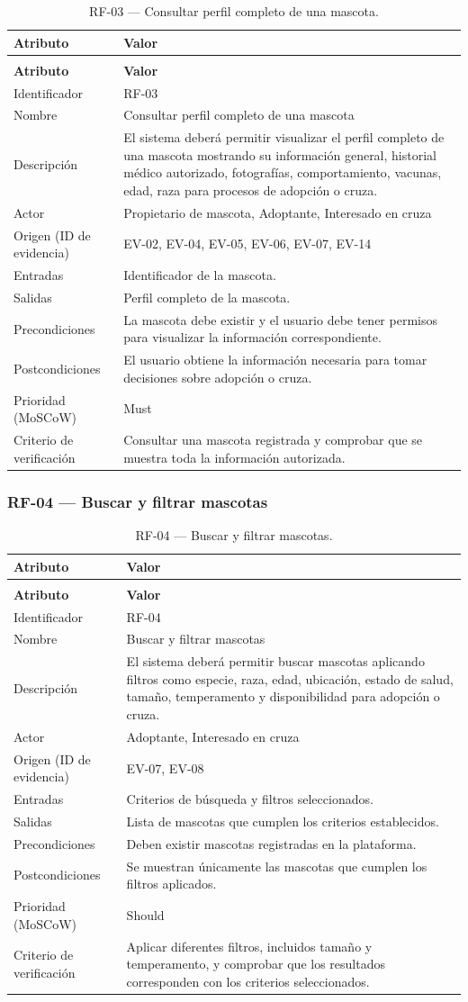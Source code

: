 \documentclass[journal,onecolumn]{IEEEtran}
\makeatletter
\newenvironment{atributos}[2]{%
	\small
	\begin{longtable}{@{}>{\raggedright\arraybackslash}p{4.2cm} >{\raggedright\arraybackslash}p{11.2cm}@{}}
		\caption{#2}\label{tab:#1}\\
		\toprule
		\textbf{Atributo} & \textbf{Valor} \\
		\midrule
		\endfirsthead
		\multicolumn{2}{@{}l}{\small\itshape (continuación)}\\
		\toprule
		\textbf{Atributo} & \textbf{Valor} \\
		\midrule
		\endhead
		\bottomrule
		\endlastfoot
	}{%
	\end{longtable}
	\normalsize
}
\makeatother
\begin{document}
	\begin{atributos}{RF-03}{RF-03 --- Consultar perfil completo de una mascota.}
		Identificador & RF-03 \\
		Nombre & Consultar perfil completo de una mascota \\
		Descripción & El sistema deberá permitir visualizar el perfil completo de una mascota mostrando su información general, historial médico autorizado, fotografías, comportamiento, vacunas, edad, raza para procesos de adopción o cruza. \\
		Actor & Propietario de mascota, Adoptante, Interesado en cruza \\
		Origen (ID de evidencia) & EV-02, EV-04, EV-05, EV-06, EV-07, EV-14 \\
		Entradas & Identificador de la mascota. \\
		Salidas & Perfil completo de la mascota. \\
		Precondiciones & La mascota debe existir y el usuario debe tener permisos para visualizar la información correspondiente. \\
		Postcondiciones & El usuario obtiene la información necesaria para tomar decisiones sobre adopción o cruza. \\
		Prioridad (MoSCoW) & Must \\
		Criterio de verificación & Consultar una mascota registrada y comprobar que se muestra toda la información autorizada. \\
	\end{atributos}
	
	\subsubsection{RF-04 --- Buscar y filtrar mascotas}
	
	\begin{atributos}{RF-04}{RF-04 --- Buscar y filtrar mascotas.}
		Identificador & RF-04 \\
		Nombre & Buscar y filtrar mascotas \\
		Descripción & El sistema deberá permitir buscar mascotas aplicando filtros como especie, raza, edad, ubicación, estado de salud, tamaño, temperamento y disponibilidad para adopción o cruza. \\
		Actor & Adoptante, Interesado en cruza \\
		Origen (ID de evidencia) & EV-07, EV-08 \\
		Entradas & Criterios de búsqueda y filtros seleccionados. \\
		Salidas & Lista de mascotas que cumplen los criterios establecidos. \\
		Precondiciones & Deben existir mascotas registradas en la plataforma. \\
		Postcondiciones & Se muestran únicamente las mascotas que cumplen los filtros aplicados. \\
		Prioridad (MoSCoW) & Should \\
		Criterio de verificación & Aplicar diferentes filtros, incluidos tamaño y temperamento, y comprobar que los resultados corresponden con los criterios seleccionados. \\
	\end{atributos}
	
\end{document}
